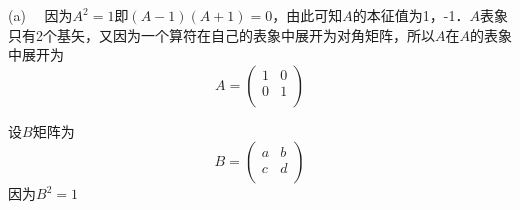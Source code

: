 (a) \ \ 因为$A^2=1$即$(A-1)(A+1)=0$，由此可知$A$的本征值为1，-1．$A$表象只有2个基矢，又因为一个算符在自己的表象中展开为对角矩阵，所以$A$在$A$的表象中展开为
$$
A=\left( \begin{matrix}
	1&		0\\
	0&		1\\
\end{matrix} \right) 
$$

设$B$矩阵为
$$
B=\left( \begin{matrix}
	a&		b\\
	c&		d\\
\end{matrix} \right) 
$$
因为$B^2=1$
